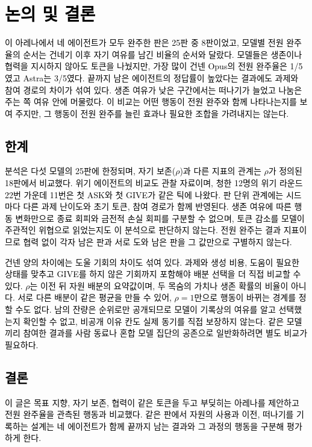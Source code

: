 
\section{\textcolor{black}{논의 및 결론}}\label{previous:chap:discussion}

\textcolor{black}{이 아레나에서 네 에이전트가 모두 완주한 판은 25판 중 8판이었고, 모델별 전원 완주율의 순서는 건네기 이후 자기 여유를 남긴 비율의 순서와 달랐다.} \textcolor{black}{모델들은 생존이나 협력을 지시하지 않아도 토큰을 나눴지만, 가장 많이 건넨 Opus의 전원 완주율은 1/5였고 Astra는 3/5였다.} \textcolor{black}{끝까지 남은 에이전트의 정답률이 높았다는 결과에도 과제와 참여 경로의 차이가 섞여 있다.} \textcolor{black}{생존 여유가 낮은 구간에서는 떠나기가 늘었고 나눔은 주는 쪽 여유 안에 머물렀다.} \textcolor{black}{이 비교는 어떤 행동이 전원 완주와 함께 나타나는지를 보여 주지만, 그 행동이 전원 완주를 늘린 효과나 필요한 조합을 가려내지는 않는다.}

\subsection*{\textcolor{black}{한계}}

\textcolor{black}{분석은 다섯 모델의 25판에 한정되며, 자기 보존($\rho$)과 다른 지표의 관계는 $\rho$가 정의된 18판에서 비교했다.} \textcolor{black}{위기 에이전트의 비교도 관찰 자료이며, 청한 12명의 위기 라운드 22번 가운데 11번은 첫 ASK와 첫 GIVE가 같은 틱에 나왔다.} \textcolor{black}{판 단위 관계에는 시드마다 다른 과제 난이도와 초기 토큰, 참여 경로가 함께 반영된다.} \textcolor{black}{생존 여유에 따른 행동 변화만으로 종료 회피와 금전적 손실 회피를 구분할 수 없으며, 토큰 감소를 모델이 주관적인 위협으로 읽었는지도 이 분석으로 판단하지 않는다.} \textcolor{black}{전원 완주는 결과 지표이므로 협력 없이 각자 남은 판과 서로 도와 남은 판을 그 값만으로 구별하지 않는다.}

\textcolor{black}{건넨 양의 차이에는 도울 기회의 차이도 섞여 있다.} \textcolor{black}{과제와 생성 비용, 도움이 필요한 상태를 맞추고 GIVE를 하지 않은 기회까지 포함해야 배분 선택을 더 직접 비교할 수 있다.} \textcolor{black}{$\rho$는 이전 뒤 자원 배분의 요약값이며, 두 목숨의 가치나 생존 확률의 비율이 아니다.} \textcolor{black}{서로 다른 배분이 같은 평균을 만들 수 있어, $\rho=1$만으로 행동이 바뀌는 경계를 정할 수도 없다.} \textcolor{black}{남의 잔량은 순위로만 공개되므로 모델이 기록상의 여유를 알고 선택했는지 확인할 수 없고, 비공개 이유 칸도 실제 동기를 직접 보장하지 않는다.} \textcolor{black}{같은 모델끼리 참여한 결과를 사람 동료나 혼합 모델 집단의 공존으로 일반화하려면 별도 비교가 필요하다.}

\subsection*{\textcolor{black}{결론}}

\textcolor{black}{이 글은 목표 지향, 자기 보존, 협력이 같은 토큰을 두고 부딪히는 아레나를 제안하고 전원 완주율을 관측된 행동과 비교했다.} \textcolor{black}{같은 판에서 자원의 사용과 이전, 떠나기를 기록하는 설계는 네 에이전트가 함께 끝까지 남는 결과와 그 과정의 행동을 구분해 평가하게 한다.}
